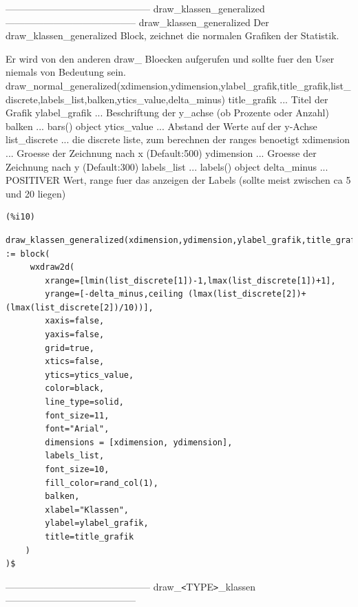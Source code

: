 \documentclass{article}
\begin{document}
--------------------------------------------- draw\_klassen\_generalized -----------------------------------------
draw\_klassen\_generalized
    Der draw\_klassen\_generalized Block, zeichnet die normalen Grafiken der Statistik.

    Er wird von den anderen draw\_ Bloecken aufgerufen und sollte fuer den User niemals von Bedeutung sein.
draw\_normal\_generalized(xdimension,ydimension,ylabel\_grafik,title\_grafik,list\_discrete,labels\_list,balken,ytics\_value,delta\_minus)
title\_grafik    ... Titel der Grafik
ylabel\_grafik   ... Beschriftung der y\_achse (ob Prozente oder Anzahl)
balken          ... bars() object
ytics\_value     ... Abstand der Werte auf der y-Achse
list\_discrete   ... die discrete liste, zum berechnen der ranges benoetigt 
xdimension      ... Groesse der Zeichnung nach x (Default:500)
ydimension      ... Groesse der Zeichnung nach y (Default:300)
labels\_list     ... labels() object
delta\_minus     ... POSITIVER Wert, range fuer das anzeigen der Labels (sollte meist zwischen ca 5 und 20 liegen)

\noindent
\begin{minipage}[t]{8ex}{\color{red}\bf
\begin{verbatim}
(%i10) 
\end{verbatim}}
\end{minipage}
\begin{minipage}[t]{\textwidth}{\color{blue}
\begin{verbatim}
draw_klassen_generalized(xdimension,ydimension,ylabel_grafik,title_grafik,list_discrete,labels_list,balken,ytics_value,delta_minus) := block(
     wxdraw2d(
        xrange=[lmin(list_discrete[1])-1,lmax(list_discrete[1])+1], 
        yrange=[-delta_minus,ceiling (lmax(list_discrete[2])+(lmax(list_discrete[2])/10))],
        xaxis=false, 
        yaxis=false, 
        grid=true,
        xtics=false, 
        ytics=ytics_value,
        color=black,
        line_type=solid,
        font_size=11, 
        font="Arial",
        dimensions = [xdimension, ydimension],
        labels_list,
        font_size=10,
        fill_color=rand_col(1),
        balken,
        xlabel="Klassen", 
        ylabel=ylabel_grafik,
        title=title_grafik
    )
)$
\end{verbatim}}
\end{minipage}

--------------------------------------------- draw\_\verb|<|TYPE\verb|>|\_klassen -----------------------------------------
\end{document}

